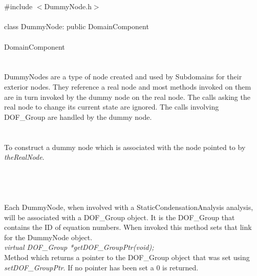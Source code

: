 
 \\

   \\
\indent \#include $<$DummyNode.h$>$  \\

  \\
\indent class DummyNode: public DomainComponent  \\



 \\
\indent DomainComponent \\
\indent{} \\

  \\
\indent DummyNodes are a type of node created and used by Subdomains for their
exterior nodes. They reference a real node and most methods invoked on
them are in turn invoked by the dummy node on the real node. The calls
asking the real node to change its current state are ignored. The
calls involving DOF\_Group are handled by the dummy node. \\


  \\
  \\
To construct a dummy node which is associated with the node pointed to
by {\em theRealNode}. \\

  \\
 \\

  \\
 \\
Each DummyNode, when involved with a StaticCondensationAnalysis
analysis, will be associated with a DOF\_Group object. It is the
DOF\_Group that contains the ID of equation numbers. When invoked this
method sets that link for the DummyNode object. \\ 


{\em virtual DOF\_Group *getDOF\_GroupPtr(void);} \\
Method which returns a pointer to the DOF\_Group object that was set
using {\em setDOF\_GroupPtr}. If no pointer has been set a $0$ is
returned. \\


